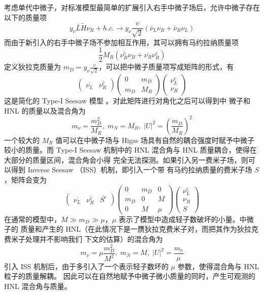 \documentclass[UTF8]{ctexart}
\begin{document}
考虑单代中微子，对标准模型最简单的扩展引入右手中微子场后，允许中微子存在以下的质量项
\begin{equation}
  y_\nu \bar{L} \tilde{H} \nu_R + h.c. \to y_\nu \frac{v}{\sqrt{2}} (\bar{\nu}_L \nu_R + \bar{\nu}_R \nu_L)
\end{equation}
而由于新引入的右手中微子场不参加相互作用，其可以拥有马约拉纳质量项
\begin{equation}
  \frac{1}{2} M_R (\overline{\nu^c_R} \nu_R + \overline{\nu_R} \nu_R^c) 
\end{equation}
定义狄拉克质量为 $m_D = y_\nu \frac{v}{\sqrt{2}}$，可以把中微子质量项写成矩阵的形式，有
\begin{equation}
  \begin{pmatrix}
    \overline{\nu_L} & \overline{\nu_R^c}
  \end{pmatrix}
  \begin{pmatrix}
    0 & m_D \\
    m_D & M_R
  \end{pmatrix}
  \begin{pmatrix}
    \nu_L^c \\
    \nu_R
  \end{pmatrix}
\end{equation}
这是简化的 Type-I Seesaw 模型 \cite{king2025righthandedneutrinosseesawmodels}。对此矩阵进行对角化之后可以得到中
微子和 HNL 的质量以及混合角为
\begin{equation}
  m_\nu = \frac{m_D^2}{M_R}, \; m_N = M_R, \; |U|^2 = \left( \frac{m_D}{M_R} \right)^2
\end{equation}
一个较大的 $M_R$ 值可以在中微子场与 Higss 场具有自然的耦合强度时赋予中微子较小的质量。而
Type-I Seesaw 机制中的 HNL 混合角与 HNL 质量耦合，使得在大部分的质量区间，混合角会小得
完全无法探测。如果引入另一费米子场，则可以得到 Inverse Seesaw （ISS）机制，即引入一个带
有马约拉纳质量的费米子场 $S$，矩阵会变为
\begin{equation}
  \begin{pmatrix}
    \overline{\nu_L} & \overline{\nu_R^c} & \overline{S^c}
  \end{pmatrix}
  \begin{pmatrix}
    0 & m_D & 0 \\
    m_D & 0 & M \\
    0  & M  & \mu
  \end{pmatrix}
  \begin{pmatrix}
    \nu_L^c \\
    \nu_R   \\
    S
  \end{pmatrix}
\end{equation}
在通常的模型中，$M \gg m_D \gg \mu$，$\mu$ 表示了模型中造成轻子数破坏的小量。中微子的
质量和产生的 HNL（在此情况下是一赝狄拉克费米子对，而把其作为狄拉克费米子处理并不影响我们
下文的估算）的混合角为 \cite{king2025righthandedneutrinosseesawmodels}
\begin{equation}
  m_\nu = \mu \frac{m_D^2}{M^2}, \; m_N = M, \; |U|^2 = \frac{m_\nu}{\mu}
\end{equation}
引入 ISS 机制后，由于多引入了一个表示轻子数坏的 $\mu$ 参数，使得混合角与 HNL 粒子的质量解耦。
因此可以在自然地赋予中微子微小质量的同时，产生可观测的 HNL 混合角与质量。
\end{document}
